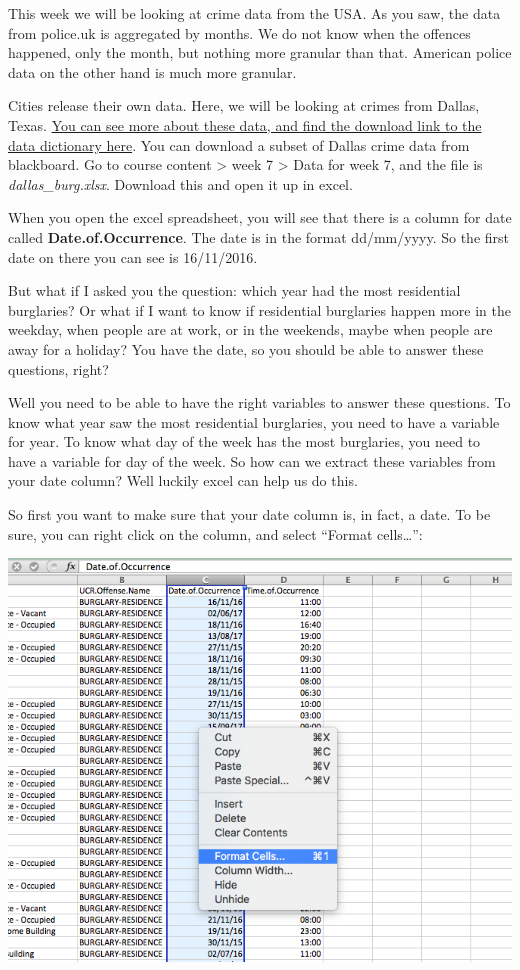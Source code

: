 \documentclass[]{book}
\theoremstyle{definition}
\theoremstyle{definition}
\theoremstyle{definition}
\theoremstyle{remark}
\begin{document}
This week we will be looking at crime data from the USA. As you saw, the
data from police.uk is aggregated by months. We do not know when the
offences happened, only the month, but nothing more granular than that.
American police data on the other hand is much more granular.

 Cities release their own data. Here, we will be looking at crimes from
Dallas, Texas.
\href{https://www.dallasopendata.com/Public-Safety/All-Crime/p9zb-d4n6/about}{You
can see more about these data, and find the download link to the data
dictionary here}. You can download a subset of Dallas crime data from
blackboard. Go to course content \textgreater{} week 7 \textgreater{}
Data for week 7, and the file is \emph{dallas\_burg.xlsx}. Download this
and open it up in excel.

When you open the excel spreadsheet, you will see that there is a column
for date called \textbf{Date.of.Occurrence}. The date is in the format
dd/mm/yyyy. So the first date on there you can see is 16/11/2016.

But what if I asked you the question: which year had the most
residential burglaries? Or what if I want to know if residential
burglaries happen more in the weekday, when people are at work, or in
the weekends, maybe when people are away for a holiday? You have the
date, so you should be able to answer these questions, right?

Well you need to be able to have the right variables to answer these
questions. To know what year saw the most residential burglaries, you
need to have a variable for year. To know what day of the week has the
most burglaries, you need to have a variable for day of the week. So how
can we extract these variables from your date column? Well luckily excel
can help us do this.

So first you want to make sure that your date column is, in fact, a
date. To be sure, you can right click on the column, and select ``Format
cells\ldots{}'':

\includegraphics{imgs/format_date_1.png}
\end{document}
